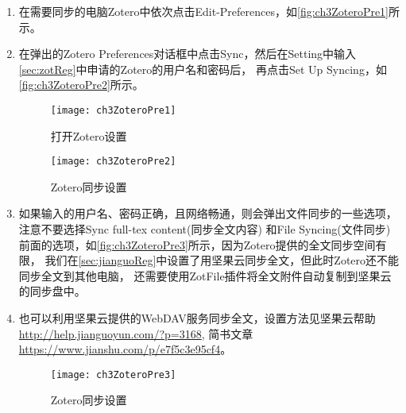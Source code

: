 \documentclass[cn,11pt,chinese]{elegantbook}
\begin{document}
		\begin{enumerate}
			\item 
			在需要同步的电脑Zotero中依次点击Edit-Preferences，如\autoref{fig:ch3ZoteroPre1}所示。
			\item
			在弹出的Zotero Preferences对话框中点击Sync，然后在Setting中输入\cref{sec:zotReg}中申请的Zotero的用户名和密码后，
			再点击Set Up Syncing，如\autoref{fig:ch3ZoteroPre2}所示。
				\begin{figure}[t]
					\centering
					\begin{minipage}[t]{\dimexpr0.5\textwidth-4em}
						\centering
						\texttt{[image: ch3ZoteroPre1]}
						\caption{打开Zotero设置}
						\label{fig:ch3ZoteroPre1}
				\end{minipage}
				\begin{minipage}[t]{\dimexpr0.5\textwidth-4em}
					\centering
					\texttt{[image: ch3ZoteroPre2]}
					\caption{Zotero同步设置}
					\label{fig:ch3ZoteroPre2}
				\end{minipage}
			\end{figure}
			\item
			如果输入的用户名、密码正确，且网络畅通，则会弹出文件同步的一些选项，注意不要选择Sync full-tex content(同步全文内容)
			和File Syncing(文件同步)前面的选项，如\autoref{fig:ch3ZoteroPre3}所示，因为Zotero提供的全文同步空间有限，
			我们在\cref{sec:jianguoReg}中设置了用坚果云同步全文，但此时Zotero还不能同步全文到其他电脑，
			还需要使用ZotFile插件将全文附件自动复制到坚果云的同步盘中。
			\item				  	
			也可以利用坚果云提供的WebDAV服务同步全文，设置方法见坚果云帮助\url{http://help.jianguoyun.com/?p=3168},
			简书文章\url{https://www.jianshu.com/p/e7f5c3e95cf4}。			  
			\begin{figure}[htbp]
				\centering
				\texttt{[image: ch3ZoteroPre3]}
				\caption{Zotero同步设置}
				\label{fig:ch3ZoteroPre3}
			\end{figure}
		\end{enumerate}
		
		
		
\end{document}
